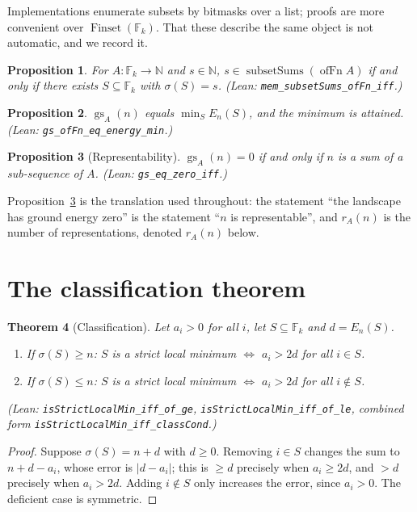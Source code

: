 \documentclass[11pt,a4paper]{article}
\theoremstyle{plain}
\newtheorem{theorem}{Theorem}[section]
\newtheorem{proposition}[theorem]{Proposition}
\theoremstyle{definition}
\theoremstyle{remark}
\DeclareMathOperator{\gs}{gs}
\newcommand{\Fk}{\mathbb{F}_k}
\newcommand{\Lean}[1]{\texttt{#1}}
\begin{document}
Implementations enumerate subsets by bitmasks over a list; proofs are more
convenient over $\operatorname{Finset}(\Fk)$. That these describe the same object
is not automatic, and we record it.

\begin{proposition}\label{prop:bridge}
For $A:\Fk\to\mathbb{N}$ and $s\in\mathbb{N}$,
$s\in\operatorname{subsetSums}(\operatorname{ofFn}A)$ if and only if there exists
$S\subseteq\Fk$ with $\sigma(S)=s$.
\textup{(Lean: \Lean{mem\_subsetSums\_ofFn\_iff}.)}
\end{proposition}

\begin{proposition}\label{prop:gs-min}
$\gs_A(n)$ equals $\min_S E_n(S)$, and the minimum is attained.
\textup{(Lean: \Lean{gs\_ofFn\_eq\_energy\_min}.)}
\end{proposition}

\begin{proposition}[Representability]\label{prop:representability}
$\gs_A(n)=0$ if and only if $n$ is a sum of a sub-sequence of $A$.
\textup{(Lean: \Lean{gs\_eq\_zero\_iff}.)}
\end{proposition}

Proposition~\ref{prop:representability} is the translation used throughout: the
statement ``the landscape has ground energy zero'' is the statement ``$n$ is
representable'', and $r_A(n)$ is the number of representations, denoted
$r_A(n)$ below.

\section{The classification theorem}\label{sec:classification}

\begin{theorem}[Classification]\label{thm:classification}
Let $a_i>0$ for all $i$, let $S\subseteq\Fk$ and $d=E_n(S)$.
\begin{enumerate}
\item If $\sigma(S)\ge n$: $S$ is a strict local minimum
      $\iff$ $a_i>2d$ for all $i\in S$.
\item If $\sigma(S)\le n$: $S$ is a strict local minimum
      $\iff$ $a_i>2d$ for all $i\notin S$.
\end{enumerate}
\textup{(Lean: \Lean{isStrictLocalMin\_iff\_of\_ge},
\Lean{isStrictLocalMin\_iff\_of\_le}, combined form
\Lean{isStrictLocalMin\_iff\_classCond}.)}
\end{theorem}

\begin{proof}
Suppose $\sigma(S)=n+d$ with $d\ge0$. Removing $i\in S$ changes the sum to
$n+d-a_i$, whose error is $|d-a_i|$; this is $\ge d$ precisely when $a_i\ge2d$,
and $>d$ precisely when $a_i>2d$. Adding $i\notin S$ only increases the error,
since $a_i>0$. The deficient case is symmetric.
\end{proof}
\end{document}
